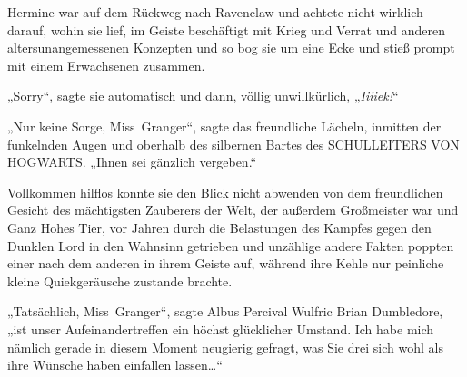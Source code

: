 \later

Hermine war auf dem Rückweg nach Ravenclaw und achtete nicht wirklich darauf, wohin sie lief, im Geiste beschäftigt mit Krieg und Verrat und anderen altersunangemessenen Konzepten und so bog sie um eine Ecke und stieß prompt mit einem Erwachsenen zusammen.

„Sorry“, sagte sie automatisch und dann, völlig unwillkürlich, „\emph{Iiiiek!}“

„Nur keine Sorge, Miss~Granger“, sagte das freundliche Lächeln, inmitten der funkelnden Augen und oberhalb des silbernen Bartes des SCHULLEITERS VON HOGWARTS. „Ihnen sei gänzlich vergeben.“

Vollkommen hilflos konnte sie den Blick nicht abwenden von dem freundlichen Gesicht des mächtigsten Zauberers der Welt, der außerdem Großmeister war und Ganz Hohes Tier, vor Jahren durch die Belastungen des Kampfes gegen den Dunklen Lord in den Wahnsinn getrieben und unzählige andere Fakten poppten einer nach dem anderen in ihrem Geiste auf, während ihre Kehle nur peinliche kleine Quiekgeräusche zustande brachte.

„Tatsächlich, Miss~Granger“, sagte Albus Percival Wulfric Brian Dumbledore, „ist unser Aufeinandertreffen ein höchst glücklicher Umstand. Ich habe mich nämlich gerade in diesem Moment neugierig gefragt, was Sie drei sich wohl als ihre Wünsche haben einfallen lassen…“

\later

